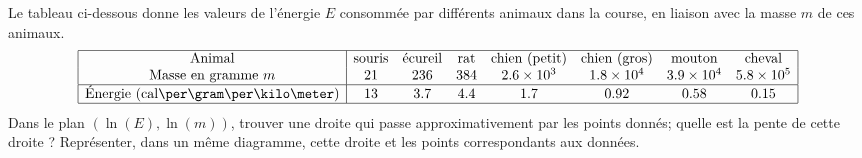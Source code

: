 \begin{exercice}\label{exoSC_serie3-0003}

	Le tableau ci-dessous donne les valeurs de l'énergie $E$ consommée par différents animaux dans la course, en liaison avec la masse $m$ de ces animaux.
	\[
		\begin{array}{|c|ccccccc|}
			\hline
			\text{Animal}& \text{souris}	&	\text{écureil}	&	\text{rat}	&	\text{chien (petit)}	&	\text{chien (gros)}	& \text{mouton}	&\text{cheval} \\
			\text{Masse en gramme }m& 21	& 236	&384&	2.6\times 10^3&	1.8\times 10^4	&	3.9\times 10^4	& 5.8\times 10^5 \\
			\hline
			\text{Énergie (cal\per\gram\per\kilo\meter)}& 13&	3.7&4.4&	1.7&	0.92&0.58&0.15\\
			\hline
		\end{array}
	\]
	Dans le plan $(\ln(E),\ln(m))$, trouver une droite qui passe approximativement par les points donnés; quelle est la pente de cette droite ? Représenter, dans un même diagramme, cette droite et les points correspondants aux données.

\end{exercice}
